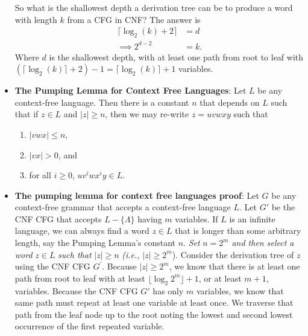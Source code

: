 \documentclass{report}
\begin{document}
\begin{itemize}
            So what is the shallowest depth a derivation tree can be to produce a word with length $k$ from a CFG in CNF? The answer is 
            \begin{align*}
                \lceil\log_{2}{(k)} + 2\rceil &= d \\
                \implies 2^{d-2} &= k
            .\end{align*}
            Where $d$ is the shallowest depth, with at least one path from root to leaf with $(\lceil \log_{2}{(k)}\rceil+2) -1 = \lceil\log_{2}{(k)}\rceil+1$ variables.
        \item \textbf{The Pumping Lemma for Context Free Languages}: Let \( L \) be any context-free language. Then there is a constant \( n \) that depends on \( L \) such that if \( z \in L \) and \( |z| \geq n \), then we may re-write \( z = uvwxy \) such that
            \begin{enumerate}
                \item \( |vwx| \leq n \),
                \item \( |vx| > 0 \), and
                \item for all \( i \geq 0 \), \( uv^i wx^i y \in L \).
            \end{enumerate}
        \item \textbf{The pumping lemma for context free languages proof}:
            Let \( G \) be any context-free grammar that accepts a context-free language \( L \).
            \bigbreak \noindent 
            Let \( G' \) be the CNF CFG that accepts \( L - \{\Lambda\} \) having \( m \) variables.
            \bigbreak \noindent 
            If \( L \) is an infinite language, we can always find a word \( z \in L \) that is longer than some arbitrary length, say the Pumping Lemma's constant \( n \).
            \bigbreak \noindent
            \textit{Set} \( n = 2^m \) \textit{and then select a word} \( z \in L \) \textit{such that} \( |z| \geq n \) \textit{(i.e.,} \( |z| \geq 2^m \)).
            \bigbreak \noindent 
            Consider the derivation tree of $z$ using the CNF CFG $G^{\prime}$.
            \bigbreak \noindent 
            Because \( |z| \geq 2^m \), we know that there is at least one path from root to leaf with at least \( \lfloor \log_2 2^m \rfloor + 1 \), or at least \( m + 1 \), variables.
            \bigbreak \noindent 
                Because the CNF CFG \( G' \) has only \( m \) variables, we know that same path must repeat at least one variable at least once.
                \bigbreak \noindent 
                We traverse that path from the leaf node up to the root noting the lowest and second lowest occurrence of the first repeated variable.

\end{itemize}
\end{document}
